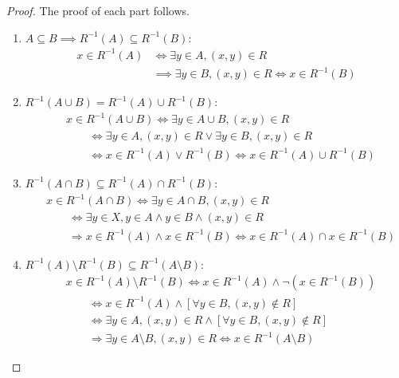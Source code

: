 \documentclass[
  letterpaper,
  10pt,
  reqno,
  twopage,
  openany]{book}
\theoremstyle{plain}
\theoremstyle{definition}
\theoremstyle{definition}
\theoremstyle{definition}
\theoremstyle{plain}
\theoremstyle{plain}
\theoremstyle{remark}
\begin{document}
\begin{proof}

The proof of each part follows.

\begin{enumerate}
\def\labelenumi{(\arabic{enumi})}
\item
  \(A\subseteq B \implies R^{-1}(A)\subseteq R^{-1}(B)\): \begin{align*}
  x\in R^{-1}(A) & \Longleftrightarrow \exists y\in A, (x,y)\in R \\
  & \implies \exists y\in B, (x,y)\in R  \Longleftrightarrow x\in R^{-1}(B)
  \end{align*}
\item
  \(R^{-1}(A\cup B)=R^{-1}(A)\cup R^{-1}(B)\): \begin{align*}
  & x\in R^{-1}(A\cup B)  \Longleftrightarrow \exists y \in A\cup B, (x,y)\in R \\ 
  & \qquad \Longleftrightarrow \exists y\in A, (x,y)\in R \lor \exists y\in B, (x,y)\in R \\ 
  & \qquad  \Longleftrightarrow x\in R^{-1}(A)\lor R^{-1}(B) \Longleftrightarrow x\in R^{-1}(A)\cup R^{-1}(B)
  \end{align*}
\item
  \(R^{-1}(A\cap B)\subseteq R^{-1}(A)\cap R^{-1}(B)\): \begin{align*}
  & x\in R^{-1}(A\cap B) \Longleftrightarrow \exists y\in A \cap B, (x,y)\in R \\
  & \qquad \Longleftrightarrow \exists y\in X, y\in A \land y\in B \land (x,y)\in R \\
  & \qquad \Longrightarrow  x\in R^{-1}(A) \land x\in R^{-1}(B) \Longleftrightarrow x\in R^{-1}(A) \cap x\in R^{-1}(B)
  \end{align*}
\item
  \(R^{-1}(A)\setminus R^{-1}(B)\subseteq R^{-1}(A\setminus B)\):
  \begin{align*}
  & x\in R^{-1}(A)\setminus R^{-1}(B) \Longleftrightarrow  x\in R^{-1}(A) \land \neg(x\in R^{-1}(B)) \\ 
  & \qquad \Longleftrightarrow  x\in R^{-1}(A)\land [\forall y\in B, (x,y)\not\in R] \\ 
  & \qquad \Longleftrightarrow  \exists y\in A, (x,y)\in R \land [\forall y\in B, (x,y)\not\in R] \\ 
  & \qquad \Longrightarrow \exists y\in A\setminus B, (x,y)\in R \Longleftrightarrow x\in R^{-1}(A\setminus B)
  \end{align*}
\end{enumerate}

\end{proof}
\end{document}
